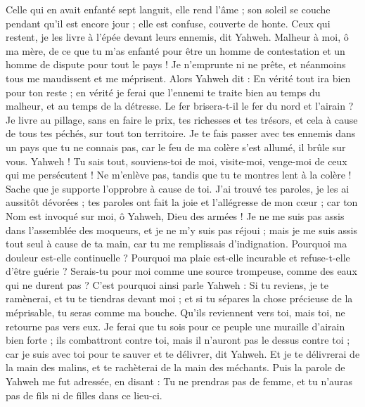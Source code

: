 \begin{multicols}{2}
Celle qui en avait enfanté sept languit, elle rend l'âme ; son soleil se couche pendant qu'il est encore jour ; elle est confuse, couverte de honte. Ceux qui restent, je les livre à l'épée devant leurs ennemis, dit Yahweh.
Malheur à moi, ô ma mère, de ce que tu m'as enfanté pour être un homme de contestation et un homme de dispute pour tout le pays ! Je n'emprunte ni ne prête, et néanmoins tous me maudissent et me méprisent.
Alors Yahweh dit : En vérité tout ira bien pour ton reste ; en vérité je ferai que l’ennemi te traite bien au temps du malheur, et au temps de la détresse.
Le fer brisera-t-il le fer du nord et l'airain ?
Je livre au pillage, sans en faire le prix, tes richesses et tes trésors, et cela à cause de tous tes péchés, sur tout ton territoire.
Je te fais passer avec tes ennemis dans un pays que tu ne connais pas, car le feu de ma colère s'est allumé, il brûle sur vous.
Yahweh ! Tu sais tout, souviens-toi de moi, visite-moi, venge-moi de ceux qui me persécutent ! Ne m'enlève pas, tandis que tu te montres lent à la colère ! Sache que je supporte l'opprobre à cause de toi.
J'ai trouvé tes paroles, je les ai aussitôt dévorées ; tes paroles ont fait la joie et l'allégresse de mon cœur ; car ton Nom est invoqué sur moi, ô Yahweh, Dieu des armées !
Je ne me suis pas assis dans l'assemblée des moqueurs, et je ne m'y suis pas réjoui ; mais je me suis assis tout seul à cause de ta main, car tu me remplissais d'indignation.
Pourquoi ma douleur est-elle continuelle ? Pourquoi ma plaie est-elle incurable et refuse-t-elle d'être guérie ? Serais-tu pour moi comme une source trompeuse, comme des eaux qui ne durent pas ?
C'est pourquoi ainsi parle Yahweh : Si tu reviens, je te ramènerai, et tu te tiendras devant moi ; et si tu sépares la chose précieuse de la méprisable, tu seras comme ma bouche. Qu'ils reviennent vers toi, mais toi, ne retourne pas vers eux.
Je ferai que tu sois pour ce peuple une muraille d'airain bien forte ; ils combattront contre toi, mais il n'auront pas le dessus contre toi ; car je suis avec toi pour te sauver et te délivrer, dit Yahweh.
Et je te délivrerai de la main des malins, et te rachèterai de la main des méchants.
\VerseOne{}Puis la parole de Yahweh me fut adressée, en disant :
Tu ne prendras pas de femme, et tu n'auras pas de fils ni de filles dans ce lieu-ci.

\end{multicols}
